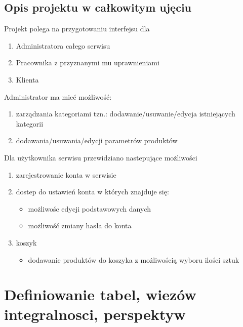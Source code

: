 \subsection{Opis projektu w całkowitym ujęciu}
Projekt polega na przygotowaniu interfejsu dla 
\begin{enumerate}
\item Administratora całego serwisu
\item Pracownika z przyznanymi mu uprawnieniami
\item Klienta
\end{enumerate}
Administrator ma mieć możliwość:
\begin{enumerate}
\item zarządzania kategoriami tzn.: dodawanie/usuwanie/edycja istniejących kategorii
\item dodawania/usuwania/edycji parametrów produktów
\end{enumerate}
Dla użytkownika serwisu przewidziano nastepujące możliwości
\begin{enumerate}
\item zarejestrowanie konta w serwisie
\item dostep do ustawień konta w których znajduje się:
\begin{itemize}
\item możliwośc edycji podstawowych danych
\item możliwość zmiany hasła do konta
\end{itemize}
\item koszyk
\begin{itemize}
	\item dodawanie produktów do koszyka z możliwością wyboru ilości sztuk
\end{itemize}
\end{enumerate}	
\section{Definiowanie tabel, wiezów integralnosci, perspektyw}

